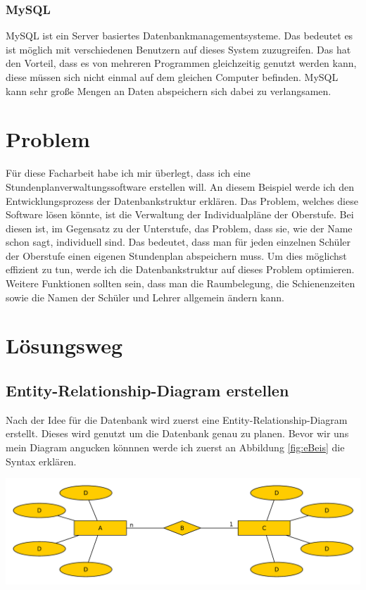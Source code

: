\documentclass[a4paper, 12pt]{article}
\theoremstyle{plain}
\theoremstyle{definition}
\begin{document}
	\subsubsection{MySQL}
	\label{sec:MySQL}
	MySQL ist ein Server basiertes Datenbankmanagementsysteme. Das bedeutet es ist möglich mit verschiedenen Benutzern auf dieses System zuzugreifen. Das hat den Vorteil, dass es von mehreren Programmen gleichzeitig genutzt werden kann, diese müssen sich nicht einmal auf dem gleichen Computer befinden. MySQL kann sehr große Mengen an Daten abspeichern sich dabei zu verlangsamen.
	\section{Problem}
	\label{sec:prob}
	
	Für diese Facharbeit habe ich mir überlegt, dass ich eine Stundenplanverwaltungssoftware erstellen will. An diesem Beispiel werde ich den Entwicklungsprozess der Datenbankstruktur erklären. Das Problem, welches diese Software lösen könnte, ist die Verwaltung der Individualpläne der Oberstufe. Bei diesen ist, im Gegensatz zu der Unterstufe, das Problem, dass sie, wie der Name schon sagt, individuell sind. Das bedeutet, dass man für jeden einzelnen Schüler der Oberstufe einen eigenen Stundenplan abspeichern muss. Um dies möglichst effizient zu tun, werde ich die Datenbankstruktur auf dieses Problem optimieren. Weitere Funktionen sollten sein, dass man die Raumbelegung, die Schienenzeiten sowie die Namen der Schüler und Lehrer allgemein ändern kann.
	
	\section{Lösungsweg}
	\label{sec:loes}
	
	\subsection{Entity-Relationship-Diagram erstellen}
	\label{sec:ERDers}
	
	Nach der Idee für die Datenbank wird zuerst eine Entity-Relationship-Diagram erstellt. Dieses wird genutzt um die Datenbank genau zu planen. Bevor wir uns mein Diagram angucken könnnen werde ich zuerst an Abbildung \ref{fig:eBeis} die Syntax erklären.
	\begin{center}
	\includegraphics[scale=0.6, ]{EntityBeis.pdf}
	\label{fig:eBeis}
	\end{center}
	
\end{document}
